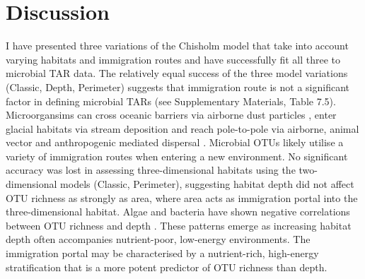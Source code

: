 \chapter{Discussion}



I have presented three variations of the Chisholm model \cite{chisholm2016maintenance} that take into account varying habitats and immigration routes and have successfully fit all three to microbial TAR data. The relatively equal success of the three model variations (Classic, Depth, Perimeter) suggests that immigration route is not a significant factor in defining microbial TARs (see Supplementary Materials, Table 7.5).  Microorgansims can cross oceanic barriers via airborne dust particles \cite{rosselli2015microbial}, enter glacial habitats via stream deposition \cite{darcy2018island} and reach pole-to-pole via airborne, animal vector and anthropogenic mediated dispersal \cite{kleinteich2017pole}. Microbial OTUs likely utilise a variety of immigration routes when entering a new environment. No significant accuracy was lost in assessing three-dimensional habitats using the two-dimensional models (Classic, Perimeter), suggesting habitat depth did not affect OTU richness as strongly as area, where area acts as immigration portal into the three-dimensional habitat. Algae and bacteria have shown negative correlations between OTU richness and depth \cite{battes2019species} \cite{turner2017microbial}. These patterns emerge as increasing habitat depth often accompanies nutrient-poor, low-energy environments. The immigration portal may be characterised by a nutrient-rich, high-energy stratification that is a more potent predictor of OTU richness than depth. \\

